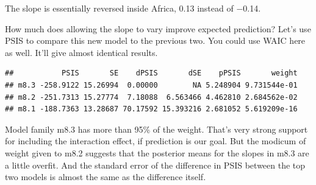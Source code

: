\documentclass[
]{article}
\newenvironment{Shaded}{\begin{snugshade}}{\end{snugshade}}
\newcommand{\CommentTok}[1]{\textcolor[rgb]{0.56,0.35,0.01}{\textit{#1}}}
\newcommand{\DataTypeTok}[1]{\textcolor[rgb]{0.13,0.29,0.53}{#1}}
\newcommand{\DecValTok}[1]{\textcolor[rgb]{0.00,0.00,0.81}{#1}}
\newcommand{\FloatTok}[1]{\textcolor[rgb]{0.00,0.00,0.81}{#1}}
\newcommand{\KeywordTok}[1]{\textcolor[rgb]{0.13,0.29,0.53}{\textbf{#1}}}
\newcommand{\NormalTok}[1]{#1}
\newcommand{\OperatorTok}[1]{\textcolor[rgb]{0.81,0.36,0.00}{\textbf{#1}}}
\newcommand{\StringTok}[1]{\textcolor[rgb]{0.31,0.60,0.02}{#1}}
\begin{document}
The slope is essentially reversed inside Africa, 0.13 instead of −0.14.

How much does allowing the slope to vary improve expected prediction?
Let's use PSIS to compare this new model to the previous two. You could
use WAIC here as well. It'll give almost identical results.

\begin{verbatim}
##           PSIS       SE    dPSIS       dSE    pPSIS       weight
## m8.3 -258.9122 15.26994  0.00000        NA 5.248904 9.731544e-01
## m8.2 -251.7313 15.27774  7.18088  6.563466 4.462810 2.684562e-02
## m8.1 -188.7363 13.28687 70.17592 15.393216 2.681052 5.619209e-16
\end{verbatim}

Model family m8.3 has more than 95\% of the weight. That's very strong
support for including the interaction effect, if prediction is our goal.
But the modicum of weight given to m8.2 suggests that the posterior
means for the slopes in m8.3 are a little overfit. And the standard
error of the difference in PSIS between the top two models is almost the
same as the difference itself.

\begin{Shaded}
\end{Shaded}
\end{document}

